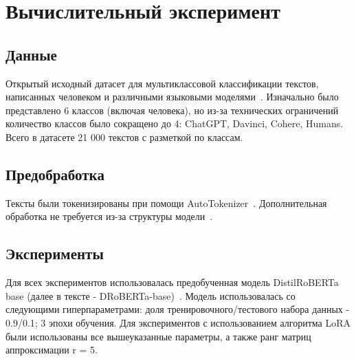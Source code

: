 \newpage

\section{Вычислительный эксперимент}
\subsection{Данные} 
Открытый исходный датасет для мультиклассовой классификации текстов, написанных человеком и различными языковыми моделями~\cite{semeval2024task8}. Изначально было представлено 6 классов (включая человека), но из-за технических ограничений количество классов было сокращено до 4: ChatGPT, Davinci, Cohere, Humans. Всего в датасете 21 000 текстов с разметкой по классам.

\subsection{Предобработка}
Тексты были токенизированы при помощи AutoTokenizer~\cite{wolf2019huggingface}. Дополнительная обработка не требуется из-за структуры модели~\cite{vaswani2017attention}.

\subsection{Эксперименты} 
Для всех экспериментов использовалась предобученная модель DistilRoBERTa base (далее в тексте - DRoBERTa-base)~\cite{liu2019roberta}. Модель использовалась со следующими гиперпараметрами: доля тренировочного/тестового набора данных - 0.9/0.1; 3 эпохи обучения. Для экспериментов с использованием алгоритма LoRA были использованы все вышеуказанные параметры, а также ранг матриц аппроксимации r = 5.

\newpage
